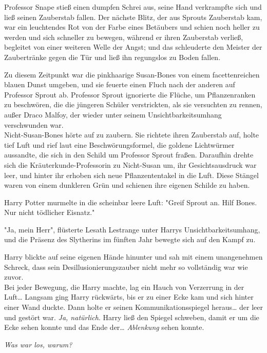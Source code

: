 {Professor Snape stieß einen dumpfen Schrei aus, seine Hand verkrampfte sich und ließ seinen Zauberstab fallen. Der nächste Blitz, der aus Sprouts Zauberstab kam, war ein leuchtendes Rot von der Farbe eines Betäubers und schien noch heller zu werden und sich schneller zu bewegen, während er ihren Zauberstab verließ, begleitet von einer weiteren Welle der Angst; und das schleuderte den Meister der Zaubertränke gegen die Tür und ließ ihn regungslos zu Boden fallen.

Zu diesem Zeitpunkt war die pinkhaarige Susan-Bones von einem facettenreichen blauen Dunst umgeben, und sie feuerte einen Fluch nach der anderen auf Professor Sprout ab. Professor Sprout ignorierte die Flüche, um Pflanzenranken zu beschwören, die die jüngeren Schüler verstrickten, als sie versuchten zu rennen, außer Draco Malfoy, der wieder unter seinem Unsichtbarkeitsumhang verschwunden war.\\ Nicht-Susan-Bones hörte auf zu zaubern. Sie richtete ihren Zauberstab auf, holte tief Luft und rief laut eine Beschwörungsformel, die goldene Lichtwürmer aussandte, die sich in den Schild um Professor Sprout fraßen. Daraufhin drehte sich die Kräuterkunde-Professorin zu Nicht-Susan um, ihr Gesichtsausdruck war leer, und hinter ihr erhoben sich neue Pflanzententakel in die Luft. Diese Stängel waren von einem dunkleren Grün und schienen ihre eigenen Schilde zu haben.

Harry Potter murmelte in die scheinbar leere Luft: "Greif Sprout an. Hilf Bones. Nur nicht tödlicher Eisnatz."

"Ja, mein Herr", flüsterte Lesath Lestrange unter Harrys Unsichtbarkeitsumhang, und die Präsenz des Slytherins im fünften Jahr bewegte sich auf den Kampf zu.

Harry blickte auf seine eigenen Hände hinunter und sah mit einem unangenehmen Schreck, dass sein Desillusionierungszauber nicht mehr so vollständig war wie zuvor.\\ Bei jeder Bewegung, die Harry machte, lag ein Hauch von Verzerrung in der Luft… Langsam ging Harry rückwärts, bis er zu einer Ecke kam und sich hinter einer Wand duckte. Dann holte er seinen Kommunikationsspiegel heraus… der leer und gestört war. \emph{Ja, natürlich}. Harry ließ den Spiegel schweben, damit er um die Ecke sehen konnte und das Ende der… \emph{Ablenkung} sehen konnte.

\emph{Was war los, warum?}

}

